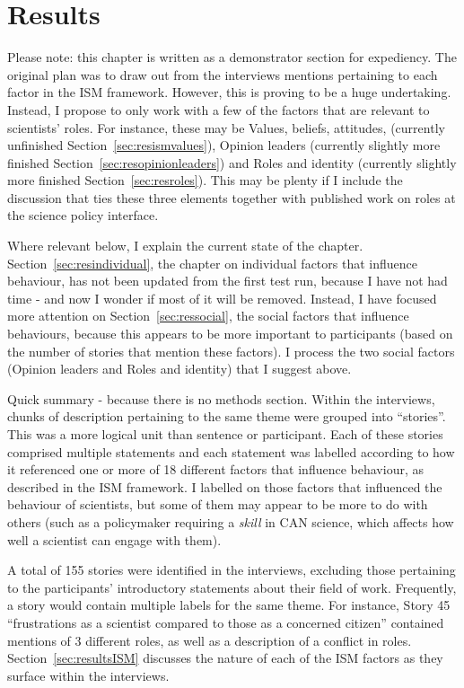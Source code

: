 \chapter{Results}\label{ch:results}

Please note: this chapter is written as a demonstrator section for expediency. The original plan was to draw out from the interviews mentions pertaining to each factor in the ISM framework. However, this is proving to be a huge undertaking. Instead, I propose to only work with a few of the factors that are relevant to scientists' roles. For instance, these may be Values, beliefs, attitudes, (currently unfinished Section~\ref{sec:resismvalues}), Opinion leaders (currently slightly more finished Section~\ref{sec:resopinionleaders}) and Roles and identity (currently slightly more finished Section~\ref{sec:resroles}). This may be plenty if I include the discussion that ties these three elements together with published work on roles at the science policy interface. 

Where relevant below, I explain the current state of the chapter. Section~\ref{sec:resindividual}, the chapter on individual factors that influence behaviour, has not been updated from the first test run, because I have not had time - and now I wonder if most of it will be removed. Instead, I have focused more attention on Section~\ref{sec:ressocial}, the social factors that influence behaviours, because this appears to be more important to participants (based on the number of stories that mention these factors). I process the two social factors (Opinion leaders and Roles and identity) that I suggest above.

Quick summary - because there is no methods section. Within the interviews, chunks of description pertaining to the same theme were grouped into ``stories''. This was a more logical unit than sentence or participant. Each of these stories comprised multiple statements and each statement was labelled according to how it referenced one or more of 18 different factors that influence behaviour, as described in the ISM framework. I labelled on those factors that influenced the behaviour of scientists, but some of them may appear to be more to do with others (such as a policymaker requiring a \emph{skill} in CAN science, which affects how well a scientist can engage with them).

A total of 155 stories were identified in the interviews, excluding those pertaining to the participants' introductory statements about their field of work. Frequently, a story would contain multiple labels for the same theme. For instance, Story 45 ``frustrations as a scientist compared to those as a concerned citizen'' contained mentions of 3 different roles, as well as a description of a conflict in roles. Section~\ref{sec:resultsISM} discusses the nature of each of the ISM factors as they surface within the interviews.

